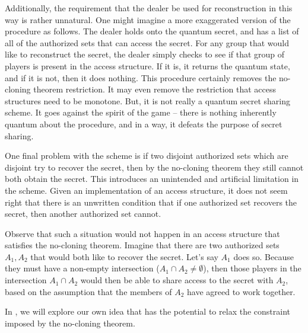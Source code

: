 Additionally, the requirement that the dealer be used for reconstruction in this way is rather unnatural. One might imagine a more exaggerated version of the procedure as follows. The dealer holds onto the quantum secret, and has a list of all of the authorized sets that can access the secret. For any group that would like to reconstruct the secret, the dealer simply checks to see if that group of players is present in the access structure. If it is, it returns the quantum state, and if it is not, then it does nothing. This procedure certainly removes the no-cloning theorem restriction. It may even remove the restriction that access structures need to be monotone. But, it is not really a quantum secret sharing scheme. It goes against the spirit of the game -- there is nothing inherently quantum about the procedure, and in a way, it defeats the purpose of secret sharing.

One final problem with the scheme is if two disjoint authorized sets which are disjoint try to recover the secret, then by the no-cloning theorem they still cannot both obtain the secret. This introduces an unintended and artificial limitation in the scheme. Given an implementation of an access structure, it does not seem right that there is an unwritten condition that if one authorized set recovers the secret, then another authorized set cannot. 

Observe that such a situation would not happen in an access structure that satisfies the no-cloning theorem. Imagine that there are two authorized sets $A_1,A_2$ that would both like to recover the secret. Let's say $A_1$ does so. Because they must have a non-empty intersection ($A_1 \cap A_2 \neq \emptyset$), then those players in the intersection $A_1 \cap A_2$ would then be able to share access to the secret with $A_2$, based on the assumption that the members of $A_2$ have agreed to work together.

In , we will explore our own idea that has the potential to relax the constraint imposed by the no-cloning theorem.